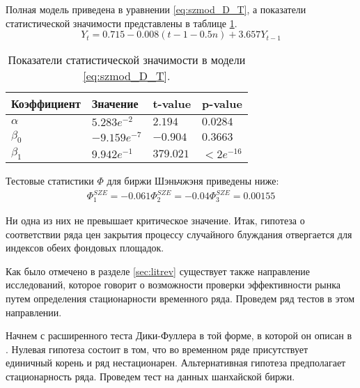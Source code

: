 \documentclass[a4paper,12pt]{article}
\begin{document}
Полная модель приведена в уравнении \ref{eq:szmod_D_T}, а показатели статистической значимости представлены в таблице \ref{tab:szmod_D_T_coeff}.
\begin{equation}
  \label{eq:szmod_D_T}
  Y_t=0.715-0.008(t-1-0.5n)+3.657Y_{t-1}
\end{equation}

\begin{table}
\centering
\caption{Показатели статистической значимости в модели \ref{eq:szmod_D_T}.}
\label{tab:szmod_D_T_coeff}
\begin{tabular}{|l|l|l|l|}
\hline
Коэффициент & Значение      & t-value   & p-value     \\ \hline
$\alpha$    & $5.283e^{-2}$  & $2.194$   & $0.0284$    \\ \hline
$\beta_0$   & $-9.159e^{-7}$ & $-0.904$  & $0.3663$    \\ \hline
$\beta_1$   & $9.942e^{-1}$  & $379.021$ & $<2e^{-16}$ \\ \hline
\end{tabular}
\end{table}

Тестовые статистики $\Phi$ для биржи Шэньчжэня приведены ниже:
\begin{align}
  \Phi_1^{SZE}=-0.061
	\Phi_2^{SZE}=-0.04
	\Phi_3^{SZE}=0.00155
\end{align}

Ни одна из них не превышает критическое значение. Итак, гипотеза о соответствии ряда цен закрытия процессу случайного блуждания отвергается для индексов обеих фондовых площадок.

Как было отмечено в разделе \ref{sec:litrev} существует также направление исследований, которое говорит о возможности проверки эффективности рынка путем определения стационарности временного ряда. Проведем ряд тестов в этом направлении.

Начнем с расширенного теста Дики-Фуллера в той форме, в которой он описан в \cite{fuller2009}. Нулевая гипотеза состоит в том, что во временном ряде присутствует единичный корень и ряд нестационарен. Альтернативная гипотеза предполагает стационарность ряда. Проведем тест на данных шанхайской биржи.
\end{document}
